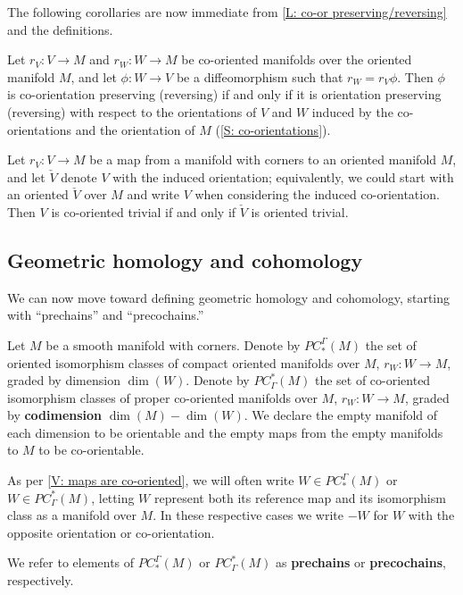 The following corollaries are now immediate from \cref{L: co-or preserving/reversing} and the definitions.

\begin{corollary}\label{C: co-or preserving is or preserving}
	Let $r_V \colon V \to M$ and $r_W \colon W \to M$ be co-oriented manifolds over the oriented manifold $M$, and let $\phi \colon W \to V$ be a diffeomorphism such that $r_W = r_V \phi$.
	Then $\phi$ is co-orientation preserving (reversing) if and only if it is orientation preserving (reversing) with respect to the orientations of $V$ and $W$ induced by the co-orientations and the orientation of $M$ (\cref{S: co-orientations}).
\end{corollary}

\begin{corollary}\label{C: induced triviality}
	Let $r_V \colon V \to M$ be a map from a manifold with corners to an oriented manifold $M$, and let $\check V$ denote $V$ with the induced orientation; equivalently, we could start with an oriented $\check V$ over $M$ and write $V$ when considering the induced co-orientation.
	Then $V$ is co-oriented trivial if and only if $\check V$ is oriented trivial.
\end{corollary}

\subsection{Geometric homology and cohomology}\label{S: geometric homology and cohomology}

We can now move toward defining geometric homology and cohomology, starting with ``prechains'' and ``precochains.''

\begin{definition}\label{D: PC}
	Let $M$ be a smooth manifold with corners.
	Denote by $PC^\Gamma_*(M)$ the set of oriented isomorphism classes of compact oriented manifolds over $M$, $r_W \colon W \to M$,
	graded by dimension $\dim(W)$.
	Denote by $PC_\Gamma^*(M)$ the set of co-oriented isomorphism classes of proper co-oriented manifolds over $M$, $r_W \colon W \to M$,
	graded by \textbf{codimension} $\dim(M) - \dim(W)$.
	We declare the empty manifold of each dimension to be orientable and the empty maps from the empty manifolds to $M$ to be co-orientable.

	As per \cref{V: maps are co-oriented}, we will often write $W \in PC^\Gamma_*(M)$ or $W \in PC_\Gamma^*(M)$, letting $W$ represent both its reference map and its isomorphism class as a manifold over $M$.
	In these respective cases we write $-W$ for $W$ with the opposite orientation or co-orientation.

	We refer to elements of $PC^\Gamma_*(M)$ or $PC_\Gamma^*(M)$ as \textbf{prechains} or \textbf{precochains}, respectively.
\end{definition}

